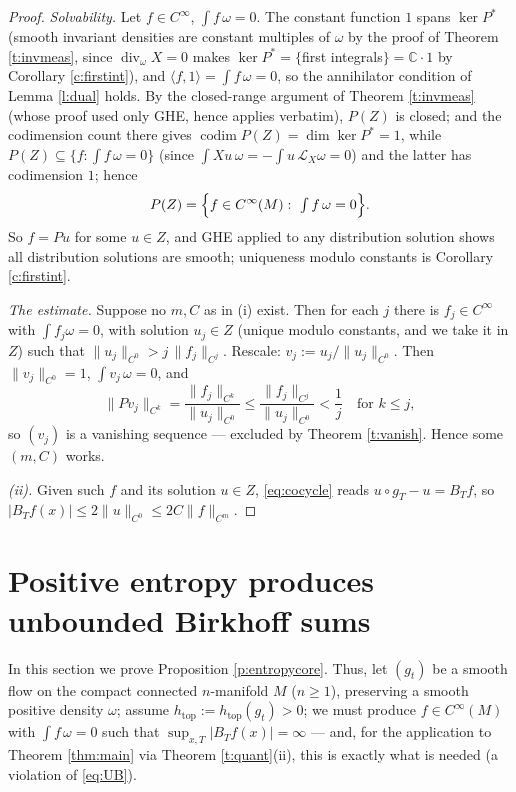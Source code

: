 \documentclass[11pt]{amsart}
\theoremstyle{plain}
\theoremstyle{definition}
\theoremstyle{remark}
\newcommand{\flow}{g_t}
\newcommand{\Lie}{\mathcal{L}}
\newcommand{\codim}{\operatorname{codim}}
\begin{document}
\begin{proof}
\emph{Solvability.}  Let $f\in C^\infty$, $\int f\,\omega=0$.  The
constant function $1$ spans $\ker P^*$ (smooth invariant densities
are constant multiples of $\omega$ by the proof of Theorem
\ref{t:invmeas}, since $\operatorname{div}_\omega X=0$ makes
$\ker P^*=\{$first integrals$\}=\mathbb{C}\cdot1$ by Corollary
\ref{c:firstint}), and $\langle f,1\rangle=\int f\,\omega=0$, so
the annihilator condition of Lemma \ref{l:dual} holds.  By the
closed-range argument of Theorem \ref{t:invmeas} (whose proof used
only GHE, hence applies verbatim), $P(Z)$ is closed; and the
codimension count there gives $\codim P(Z)=\dim\ker P^*=1$, while
$P(Z)\subseteq\{f:\int f\,\omega=0\}$ (since
$\int Xu\,\omega=-\int u\,\Lie_X\omega=0$) and the latter has
codimension $1$; hence
\[
P(Z)=\Bigl\{f\in C^\infty(M):\ \textstyle\int f\,\omega=0\Bigr\}.
\]
So $f=P u$ for some $u\in Z$, and GHE applied to any distribution
solution shows all distribution solutions are smooth; uniqueness
modulo constants is Corollary \ref{c:firstint}.

\emph{The estimate.}  Suppose no $m,C$ as in (i) exist.  Then for
each $j$ there is $f_j\in C^\infty$ with $\int f_j\omega=0$, with
solution $u_j\in Z$ (unique modulo constants, and we take it in
$Z$) such that $\|u_j\|_{C^0}>j\,\|f_j\|_{C^{j}}$.  Rescale:
$v_j:=u_j/\|u_j\|_{C^0}$.  Then $\|v_j\|_{C^0}=1$,
$\int v_j\,\omega=0$, and
\[
\|Pv_j\|_{C^{k}}=\frac{\|f_j\|_{C^k}}{\|u_j\|_{C^0}}
\le \frac{\|f_j\|_{C^{j}}}{\|u_j\|_{C^0}}<\frac1j
\quad\text{for }k\le j ,
\]
so $(v_j)$ is a vanishing sequence --- excluded by Theorem
\ref{t:vanish}.  Hence some $(m,C)$ works.

\emph{(ii).}  Given such $f$ and its solution $u\in Z$,
\eqref{eq:cocycle} reads $u\circ g_T-u=B_Tf$, so
$|B_Tf(x)|\le2\|u\|_{C^0}\le 2C\|f\|_{C^{m}}$.
\end{proof}

\section{Positive entropy produces unbounded Birkhoff sums}\label{s:entropy}

In this section we prove Proposition \ref{p:entropycore}.  Thus,
let $(\flow)$ be a smooth flow on the compact connected $n$-manifold
$M$ ($n\ge1$), preserving a smooth positive density $\omega$; assume
$h_{\mathrm{top}}:=h_{\mathrm{top}}(\flow)>0$; we must produce
$f\in C^\infty(M)$ with $\int f\,\omega=0$ such that
$\sup_{x,T}|B_Tf(x)|=\infty$ --- and, for the application to
Theorem \ref{thm:main} via Theorem \ref{t:quant}(ii), this is
exactly what is needed (a violation of \eqref{eq:UB}).
\end{document}
